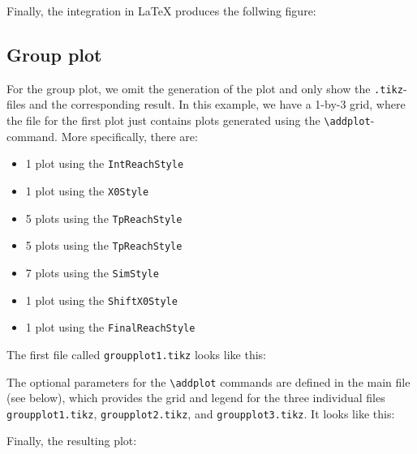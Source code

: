 \documentclass{article}
\begin{document}
\bigskip
{\small {} }

\noindent
Finally, the integration in LaTeX produces the follwing figure:

\bigskip

\begin{center}
	
\end{center}



\pagebreak

\subsection{Group plot}
\label{ssec:ex_groupplot}

For the group plot, we omit the generation of the plot and only show the \verb|.tikz|-files and the corresponding result.
In this example, we have a 1-by-3 grid, where the file for the first plot just contains plots generated using the \verb|\addplot|-command.
More specifically, there are:
%
\begin{itemize}[itemsep=0pt]
	\item 1 plot using the \verb|IntReachStyle|
	\item 1 plot using the \verb|X0Style|
	\item 5 plots using the \verb|TpReachStyle|
	\item 5 plots using the \verb|TpReachStyle|
	\item 7 plots using the \verb|SimStyle|
	\item 1 plot using the \verb|ShiftX0Style|
	\item 1 plot using the \verb|FinalReachStyle|
\end{itemize}

The first file called \verb|groupplot1.tikz| looks like this:

\bigskip
{\small {} }

\noindent
The optional parameters for the \verb|\addplot| commands are defined in the main file (see below), which provides the grid and legend for the three individual files \verb|groupplot1.tikz|, \verb|groupplot2.tikz|, and \verb|groupplot3.tikz|.
It looks like this:

\bigskip
{\small {} }

\noindent
Finally, the resulting plot:

\bigskip
\begin{center}
	
\end{center}
\end{document}
